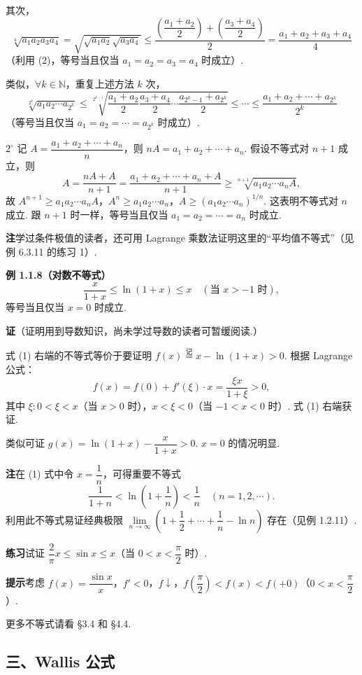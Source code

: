 \documentclass[UTF8,12pt,a4paper,fontset=fandol]{ctexart}
\begin{document}
其次，
\[
  \sqrt[4]{a_1a_2a_3a_4}
  =\sqrt{\sqrt{a_1a_2}\sqrt{a_3a_4}}
  \le \frac{\left(\dfrac{a_1+a_2}{2}\right)+\left(\dfrac{a_3+a_4}{2}\right)}2
  =\frac{a_1+a_2+a_3+a_4}{4}
\]
（利用 (2)，等号当且仅当 $a_1=a_2=a_3=a_4$ 时成立）.

类似，$\forall k\in\mathbb{N}$，重复上述方法 $k$ 次，
\[
  \sqrt[2^k]{a_1a_2\cdots a_{2^k}}
  \le
  \sqrt[2^{k-1}]{\frac{a_1+a_2}{2}\frac{a_3+a_4}{2}\cdots\frac{a_{2^k-1}+a_{2^k}}2}
  \le\cdots\le
  \frac{a_1+a_2+\cdots+a_{2^k}}{2^k}
\]
（等号当且仅当 $a_1=a_2=\cdots=a_{2^k}$ 时成立）.

$2^\circ$ 记 $A=\dfrac{a_1+a_2+\cdots+a_n}{n}$，则 $nA=a_1+a_2+\cdots+a_n$. 假设不等式对 $n+1$ 成立，则
\[
  A=\frac{nA+A}{n+1}=\frac{a_1+a_2+\cdots+a_n+A}{n+1}
  \ge \sqrt[n+1]{a_1a_2\cdots a_nA},
\]
故 $A^{n+1}\ge a_1a_2\cdots a_nA$，$A^n\ge a_1a_2\cdots a_n$，$A\ge(a_1a_2\cdots a_n)^{1/n}$. 这表明不等式对 $n$ 成立. 跟 $n+1$ 时一样，等号当且仅当 $a_1=a_2=\cdots=a_n$ 时成立.

\noindent\textbf{注}\quad 学过条件极值的读者，还可用 Lagrange 乘数法证明这里的“平均值不等式”（见例 6.3.11 的练习 1）.

\noindent\textbf{例 1.1.8（对数不等式）}
\[
  \frac{x}{1+x}\le \ln(1+x)\le x\quad(\text{当 }x>-1\text{ 时}),
\tag{1}
\]
等号当且仅当 $x=0$ 时成立.

\noindent\textbf{证}\quad （证明用到导数知识，尚未学过导数的读者可暂缓阅读.）

式 (1) 右端的不等式等价于要证明 $f(x)\stackrel{\text{记}}{=}x-\ln(1+x)>0$. 根据 Lagrange 公式：
\[
  f(x)=f(0)+f'(\xi)\cdot x=\frac{\xi x}{1+\xi}>0,
\]
其中 $\xi:0<\xi<x$（当 $x>0$ 时），$x<\xi<0$（当 $-1<x<0$ 时）. 式 (1) 右端获证.

类似可证 $g(x)=\ln(1+x)-\dfrac{x}{1+x}>0$. $x=0$ 的情况明显.

\noindent\textbf{注}\quad 在 (1) 式中令 $x=\dfrac1n$，可得重要不等式
\[
  \frac1{1+n}<\ln\left(1+\frac1n\right)<\frac1n\quad(n=1,2,\cdots).
\tag{2}
\]
利用此不等式易证经典极限 $\lim\limits_{n\to\infty}\left(1+\dfrac12+\cdots+\dfrac1n-\ln n\right)$ 存在（见例 1.2.11）.

\noindent\textbf{练习}\quad 试证 $\dfrac2\pi x\le \sin x\le x$（当 $0<x<\dfrac\pi2$ 时）.

\noindent\textbf{提示}\quad 考虑 $f(x)=\dfrac{\sin x}{x}$，$f'<0$，$f\downarrow$，$f\left(\dfrac\pi2\right)<f(x)<f(+0)$（$0<x<\dfrac\pi2$）.

更多不等式请看 §3.4 和 §4.4.

\subsection*{三、Wallis 公式}
\end{document}
